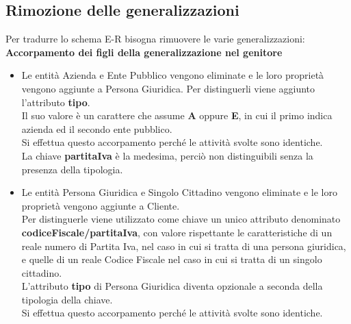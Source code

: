 \documentclass[legalpaper]{article}
\begin{document}
\subsection{Rimozione delle generalizzazioni}
Per tradurre lo schema E-R bisogna rimuovere le varie generalizzazioni:\\
\newline
\textbf{Accorpamento dei figli della generalizzazione nel genitore}
\begin{itemize}
	\item Le entità Azienda e Ente Pubblico vengono eliminate e le loro proprietà vengono aggiunte a Persona Giuridica. Per distinguerli viene aggiunto l'attributo \textbf{tipo}. \\Il suo valore è un carattere che assume \textbf{A} oppure \textbf{E}, in cui il primo indica azienda ed il secondo ente pubblico.\\
	Si effettua questo accorpamento perché le attività svolte sono identiche. \\La chiave \textbf{partitaIva} è la medesima, perciò non distinguibili senza la presenza della tipologia.
	\item Le entità Persona Giuridica e Singolo Cittadino vengono eliminate e le loro proprietà vengono aggiunte a Cliente. \\Per distinguerle viene utilizzato come chiave un unico attributo denominato \textbf{codiceFiscale/partitaIva}, con valore rispettante le caratteristiche di un reale numero di Partita Iva, nel caso in cui si tratta di una persona giuridica, e quelle di un reale Codice Fiscale nel caso in cui si tratta di un singolo cittadino.\\ L'attributo \textbf{tipo} di Persona Giuridica diventa opzionale a seconda della tipologia della chiave.\\
	Si effettua questo accorpamento perché le attività svolte sono identiche.
\end{itemize}

\end{document}
